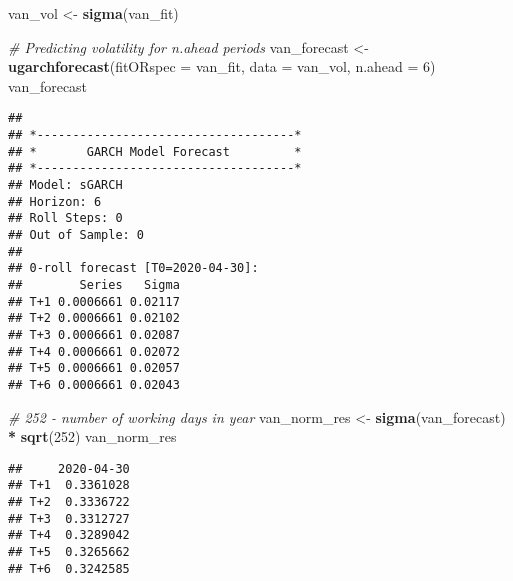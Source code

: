 \documentclass[]{article}
\newenvironment{Shaded}{\begin{snugshade}}{\end{snugshade}}
\newcommand{\CommentTok}[1]{\textcolor[rgb]{0.56,0.35,0.01}{\textit{#1}}}
\newcommand{\DataTypeTok}[1]{\textcolor[rgb]{0.13,0.29,0.53}{#1}}
\newcommand{\DecValTok}[1]{\textcolor[rgb]{0.00,0.00,0.81}{#1}}
\newcommand{\KeywordTok}[1]{\textcolor[rgb]{0.13,0.29,0.53}{\textbf{#1}}}
\newcommand{\NormalTok}[1]{#1}
\newcommand{\OperatorTok}[1]{\textcolor[rgb]{0.81,0.36,0.00}{\textbf{#1}}}
\newcommand{\StringTok}[1]{\textcolor[rgb]{0.31,0.60,0.02}{#1}}
\begin{document}
\begin{Shaded}
\begin{Highlighting}[]
\NormalTok{van_vol <-}\StringTok{ }\KeywordTok{sigma}\NormalTok{(van_fit)}

\CommentTok{# Predicting volatility for n.ahead periods}
\NormalTok{van_forecast <-}\StringTok{ }\KeywordTok{ugarchforecast}\NormalTok{(}\DataTypeTok{fitORspec =}\NormalTok{ van_fit,}
                               \DataTypeTok{data =}\NormalTok{ van_vol, }\DataTypeTok{n.ahead =} \DecValTok{6}\NormalTok{)}
\NormalTok{van_forecast}
\end{Highlighting}
\end{Shaded}

\begin{verbatim}
## 
## *------------------------------------*
## *       GARCH Model Forecast         *
## *------------------------------------*
## Model: sGARCH
## Horizon: 6
## Roll Steps: 0
## Out of Sample: 0
## 
## 0-roll forecast [T0=2020-04-30]:
##        Series   Sigma
## T+1 0.0006661 0.02117
## T+2 0.0006661 0.02102
## T+3 0.0006661 0.02087
## T+4 0.0006661 0.02072
## T+5 0.0006661 0.02057
## T+6 0.0006661 0.02043
\end{verbatim}

\begin{Shaded}
\begin{Highlighting}[]
\CommentTok{# 252 - number of working days in year}
\NormalTok{van_norm_res <-}\StringTok{ }\KeywordTok{sigma}\NormalTok{(van_forecast) }\OperatorTok{*}\StringTok{ }\KeywordTok{sqrt}\NormalTok{(}\DecValTok{252}\NormalTok{)}
\NormalTok{van_norm_res}
\end{Highlighting}
\end{Shaded}

\begin{verbatim}
##     2020-04-30
## T+1  0.3361028
## T+2  0.3336722
## T+3  0.3312727
## T+4  0.3289042
## T+5  0.3265662
## T+6  0.3242585
\end{verbatim}

\begin{Shaded}
\end{Shaded}
\end{document}
